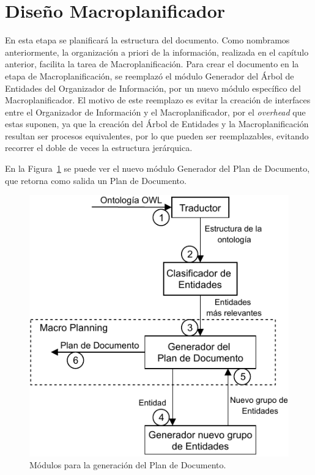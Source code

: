 \section{Diseño Macroplanificador}
\label{sec:macro_planning}
En esta etapa se planificará la estructura del documento. Como nombramos anteriormente, la organización a priori de la información, realizada en el capítulo anterior, facilita la tarea de Macroplanificación. Para crear el documento en la etapa de Macroplanificación, se reemplazó el módulo Generador del Árbol de Entidades del Organizador de Información, por un nuevo módulo específico del Macroplanificador. El motivo de este reemplazo es evitar la creación de interfaces entre el Organizador de Información y el Macroplanificador, por el \emph{overhead} que estas suponen, ya que la creación del Árbol de Entidades y la Macroplanificación resultan ser procesos equivalentes, por lo que pueden ser reemplazables, evitando recorrer el doble de veces la estructura jerárquica.

En la Figura~\ref{fig:modulos_plan_documento} se puede ver el nuevo módulo Generador del Plan de Documento, que retorna como salida un Plan de Documento.

\begin{figure}
    \centering
    \includegraphics{img/generacion_documento/modulos_plan_documento.pdf}
    \caption{Módulos para la generación del Plan de Documento.}
    \label{fig:modulos_plan_documento}
\end{figure}

